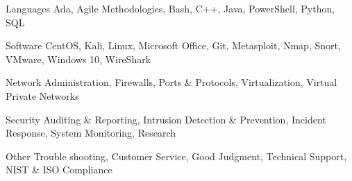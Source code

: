 



\begin{cvskills}
  \cvskill
    {Languages} %
     {Ada, Agile Methodologies, Bash, C++, Java, PowerShell, Python, SQL} %


  \cvskill
     {Software}
     {CentOS, Kali, Linux, Microsoft Office, Git, Metasploit, Nmap, Snort, VMware, Windows 10, WireShark}

  \cvskill
     {Network}
     {Administration,  Firewalls,  Ports \& Protocols,  Virtualization,  Virtual Private Networks}

  \cvskill
     {Security}
     {Auditing \& Reporting,  Intrusion Detection \& Prevention,  Incident Response, System Monitoring,  Research }

  \cvskill
     {Other}
     {Trouble shooting, Customer Service, Good Judgment, Technical Support, NIST \& ISO Compliance}



\end{cvskills}
